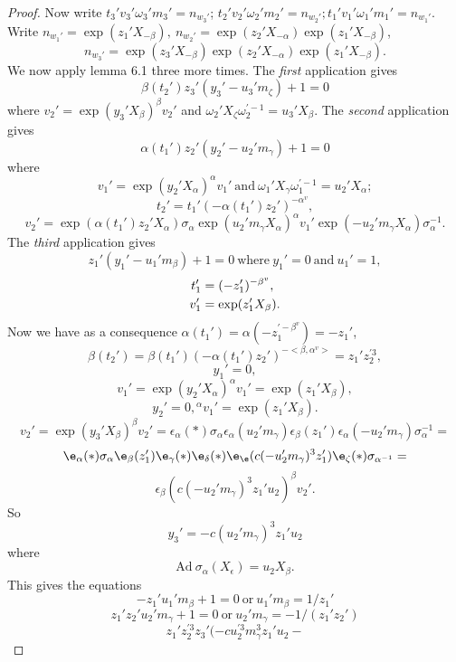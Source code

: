 \documentclass{memo-l}
\theoremstyle{definition}
\theoremstyle{remark}
\numberwithin{section}{chapter}
\numberwithin{equation}{chapter}
\begin{document}
\begin{proof}
Now write $t_{3}'v_{3}'{\omega}_{3}'m_{3}' = n_{w_3'}$;
$t_{2}'v_{2}'{\omega}_{2}'m_{2}' = n_{w_2'};
t_{1}'v_{1}'{\omega}_{1}'m_{1}' = n_{w_1'}$.
 Write $n_{w_1'} = \exp(z_{1}'X_{-{\beta}}), \
n_{w_2'} = \exp(z_{2}'X_{-{\alpha}})
\exp(z_{1}'X_{-{\beta}})$, $$n_{w_3'} =
\exp(z_{3}'X_{-{\beta}})\exp(z_{2}'X_{-{\alpha}})\exp(z_{1}'X_{-{\beta}}).$$
 We now apply lemma 6.1 three more times.
 The {\it first}  application gives
$$
{\beta}(t_{2}')z_{3}'(y_{3}'-u_{3}'m_{{\zeta}})+1 = 0
$$
where $v_{2}' = \exp(y_{3}'X_{{\beta}})^{{\beta}}v_{2}'$ and
${\omega}_{2}'X_{{\zeta}}{\omega}_{2}^{\prime-1}=u_{3}'X_{{\beta}}$.
 The {\it second}  application gives
$$
{\alpha}(t_{1}')z_{2}'(y_{2}'-u_{2}'m_{{\gamma}})+1 = 0
$$
where
$$
v_{1}' = \exp(y_{2}'X_{{\alpha}})^{{\alpha}}v_{1}'\ {\text{and}}\
{\omega}_{1}'X_{{\gamma}}{\omega}_{1}^{\prime-1}=u_{2}'X_{{\alpha}};
$$
$$
t_{2}' = t_{1}'(-{\alpha}(t_{1}')z_{2}')^{-\alpha^v} ,
$$
$$
v_{2}' = \exp({\alpha}(t_{1}')z_{2}'X_{{\alpha}}){\sigma}_{{\alpha}}
\exp(u_{2}'m_{{\gamma}}X_{{\alpha}})^{{\alpha}}v_{1}'
\exp(-u_{2}'m_{{\gamma}}X_{{\alpha}}){\sigma}_{{\alpha}}^{-1}.
$$
The {\it third}  application gives
$$
z_{1}'(y_{1}'-u_{1}'m_{{\beta}})+1 = 0\ {\text{where}}\
y_{1}' = 0\  {\text{and}}\ u_{1}' = 1,
$$
$$
\aligned
t_{1}' &= (-z_1')^{-\beta^v} ,\\
v_{1}' &= \exp(z_{1}'X_{{\beta}}) .
\endaligned
$$
Now we have as a consequence ${\alpha}(t_{1}') =
{\alpha}(-z_{1}^{\prime-\beta^v}) = -z_{1}'$,
$$
\beta(t_{2}') = {\beta}(t_{1}')(-{\alpha}(t_{1}')z_{2}')^{-<\beta,\alpha^v>}
= z_{1}'z_{2}^{\prime3},
$$
$$
y_{1}'= 0,
$$
$$
v_{1}' = \exp(y_{2}'X_{{\alpha}})^{{\alpha}}v_{1}' = \exp(z_{1}'X_{{\beta}}),
$$
$$
y_{2}' = 0, {}^\alpha v_{1}' = \exp(z_{1}'X_{{\beta}}).
$$
$$
v_{2}' = \exp(y_{3}'X_{{\beta}})^{{\beta}}v_{2}' = {\epsilon}_{{\alpha}}(*)
{\sigma}_{{\alpha}}{\epsilon}_{{\alpha}}(u_{2}'m_{{\gamma}})
{\epsilon}_{{\beta}}(z_{1}'){\epsilon}_{{\alpha}}
(-u_{2}'m_{{\gamma}}){\sigma}_{{\alpha}}^{-1} =
$$
%
$$
\e_{{\alpha}}(*){\sigma}_{\alpha}\e_\beta(z_{1}')
{\e}_\gamma(*)\e_\delta(*)\e_\e(c(-u_{2}'m_{{\gamma}})^{3}z_{1}')
\e_\zeta(*) {\sigma}_{\alpha^{-1}} =
$$
$$
{\epsilon}_{{\beta}}(c(-u_{2}'m_{{\gamma}})^{3}z_{1}'u_{2})^{{\beta}}v_{2}'.
$$
So
$$
y_{3}' = -c(u_{2}'m_{{\gamma}})^{3}z_{1}'u_{2}
$$
where
$$
{\text{Ad}}\ {\sigma}_{{\alpha}}(X_{{\epsilon}}) = u_{2}X_{{\beta}}.
$$
This gives the equations
$$
-z_{1}'u_{1}'m_{{\beta}}+1=0\ {\text{or}}\ u_{1}'m_{{\beta}} = 1/z_{1}'
$$
$$
z_{1}'z_{2}'u_{2}'m_{{\gamma}}+1 = 0\ {\text{or}}\ u_{2}'m_{{\gamma}} =
-1/(z_{1}'z_{2}')
$$
$$
z_{1}'z_{2}^{\prime3}z_{3}'(-cu_{2}^{\prime3}m_{{\gamma}}^{3}z_{1}'u_{2} -
$$
\end{proof}
\end{document}
